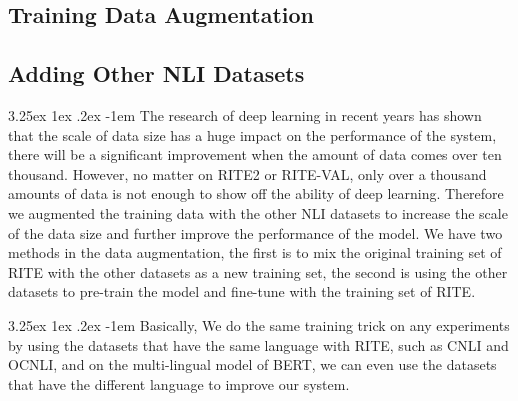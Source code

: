 \documentclass[12pt]{article}
\makeatletter
\renewcommand\paragraph{\@startsection{paragraph}{5}{\z@}%
  {3.25ex \@plus1ex \@minus.2ex}%
  {-1em}%
  {\normalfont\normalsize\bfseries}}
\makeatother
\begin{document}
\begin{CJK*}{UTF8}{bkai}
\begin{spacing}{1.77}
\section{Training Data Augmentation} \label{section:pseudo}
\subsection{Adding Other NLI Datasets}
\paragraph{}
The research of deep learning in recent years has shown that the scale of data size has a huge impact on the performance of the system, there will be a significant improvement when the amount of data comes over ten thousand. However, no matter on RITE2 or RITE-VAL, only over a thousand amounts of data is not enough to show off the ability of deep learning. Therefore we augmented the training data with the other NLI datasets to increase the scale of the data size and further improve the performance of the model. We have two methods in the data augmentation, the first is to mix the original training set of RITE with the other datasets as a new training set, the second is using the other datasets to pre-train the model and fine-tune with the training set of RITE.

\paragraph{}
Basically, We do the same training trick on any experiments by using the datasets that have the same language with RITE, such as CNLI and OCNLI, and on the multi-lingual model of BERT, we can even use the datasets that have the different language to improve our system.


\end{spacing}
\end{CJK*}
\end{document}
